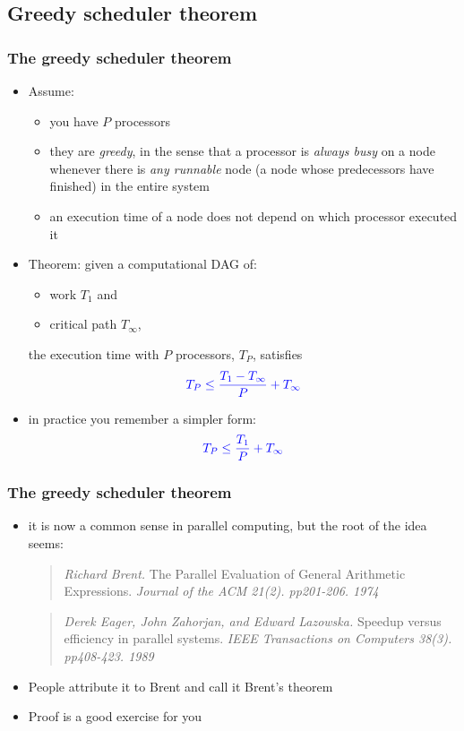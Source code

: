 \documentclass[12pt,dvipdfmx]{beamer}
\newcommand{\ao}[1]{{\color{blue}#1}}
\begin{document}
\subsection{Greedy scheduler theorem}
\begin{frame}
\frametitle{The greedy scheduler theorem}

\begin{itemize}
\item<1-> Assume:
  \begin{itemize}
  \item you have $P$ processors
  \item they are \ao{\em greedy}, in the sense that 
    a processor is \ao{\em always busy} on a node whenever 
    there is \ao{\em any runnable} node (a node whose predecessors have finished) in the entire system
  \item an execution time of a node does not depend on
    which processor executed it
  \end{itemize}

\item<2-> Theorem: 
  given a computational DAG of:
  \begin{itemize}
  \item work $T_1$ and
  \item critical path $T_\infty$,
  \end{itemize}
  the execution time 
  with $P$ processors, \ao{$T_P$}, satisfies
  \[ \ao{T_P \leq \frac{T_1 - T_\infty}{P} + T_\infty} \]

\item<3-> in practice you remember a simpler form:
  \[ \ao{T_P \leq \frac{T_1}{P} + T_\infty} \]
\end{itemize}
\end{frame}


\begin{frame}
\frametitle{The greedy scheduler theorem}
\begin{itemize}
\item it is now a common sense in parallel computing, but
the root of the idea seems:

\begin{quote}
{\em Richard Brent.}
The Parallel Evaluation of General Arithmetic Expressions.
{\em Journal of the ACM 21(2). pp201-206. 1974}
\end{quote}

\begin{quote}
{\em Derek Eager, John Zahorjan, and Edward Lazowska.}
  Speedup versus efficiency in parallel systems.
{\em IEEE Transactions on Computers 38(3). pp408-423. 1989}
\end{quote}

\item People attribute it to Brent and call it 
  \ao{Brent's theorem}

\item Proof is a good exercise for you
\end{itemize}
\end{frame}
\end{document}
